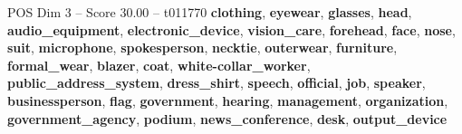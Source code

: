 \begin{textsample}{POS Dim 3 – Score 30.00 – t011770}  \label{ex:f3_pos_036}
\textbf{clothing}, \textbf{eyewear}, \textbf{glasses}, \textbf{head}, \textbf{audio\_equipment}, \textbf{electronic\_device}, \textbf{vision\_care}, \textbf{forehead}, \textbf{face}, \textbf{nose}, \textbf{suit}, \textbf{microphone}, \textbf{spokesperson}, \textbf{necktie}, \textbf{outerwear}, \textbf{furniture}, \textbf{formal\_wear}, \textbf{blazer}, \textbf{coat}, \textbf{white-collar\_worker}, \textbf{public\_address\_system}, \textbf{dress\_shirt}, \textbf{speech}, \textbf{official}, \textbf{job}, \textbf{speaker}, \textbf{businessperson}, \textbf{flag}, \textbf{government}, \textbf{hearing}, \textbf{management}, \textbf{organization}, \textbf{government\_agency}, \textbf{podium}, \textbf{news\_conference}, \textbf{desk}, \textbf{output\_device}

\end{textsample}

